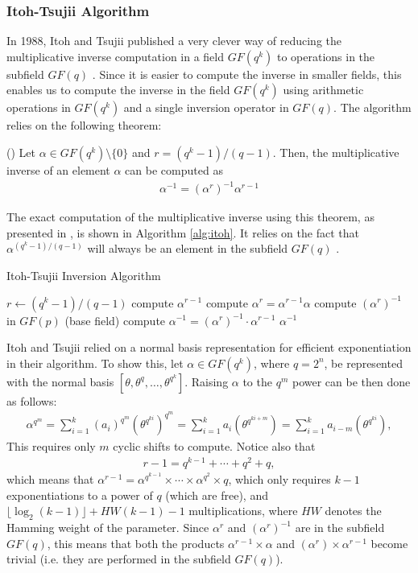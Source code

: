 \subsubsection{Itoh-Tsujii Algorithm}
In 1988, Itoh and Tsujii published a very clever way of reducing the multiplicative inverse computation in a field $GF(q^k)$ to operations in the subfield $GF(q)$ \cite{Itoh88-1}. Since it is easier to compute the inverse in smaller fields, this enables us to compute the inverse in the field $GF(q^k)$ using arithmetic operations in $GF(q^k)$ and a single inversion operator in $GF(q)$. The algorithm relies on the following theorem:
\begin{thm}
(\cite{Itoh88-1}) Let $\alpha \in GF(q^k) \setminus \{0\}$ and $r = (q^k - 1)/(q - 1)$. Then, the multiplicative inverse of an element $\alpha$ can be computed as
\begin{align*}
\alpha^{-1} = (\alpha^r)^{-1}\alpha^{r-1}
\end{align*}
\end{thm}
The exact computation of the multiplicative inverse using this theorem, as presented in \cite{Itoh88-1}, is shown in Algorithm \ref{alg:itoh}. It relies on the fact that $\alpha^{(q^k - 1)/(q-1)}$ will always be an element in the subfield $GF(q)$ \cite{Lidl94-1}.
\begin{algorithm}[t] %
\caption{Itoh-Tsujii Inversion Algorithm} \label{alg:itoh}
\begin{algorithmic}[1]
	\State $r \gets (q^k - 1)/(q-1)$
	\State compute $\alpha^{r-1}$
	\State compute $\alpha^r = \alpha^{r-1}\alpha$
	\State compute $(\alpha^r)^{-1}$ in $GF(p)$ (base field)
	\State compute $\alpha^{-1} = (\alpha^r)^{-1} \cdot \alpha^{r-1}$
	\State \Return $\alpha^{-1}$
\end{algorithmic}
\end{algorithm}
Itoh and Tsujii relied on a normal basis representation for efficient exponentiation in their algorithm. To show this, let $\alpha \in GF(q^k)$, where $q = 2^n$, be represented with the normal basis $[\theta,\theta^q,\dots,\theta^{q^{k}}]$. Raising $\alpha$ to the $q^m$ power can be then done as follows:
\begin{align*}
\alpha^{q^{m}} = \sum_{i = 1}^{k} (a_i)^{q^{m}} (\theta^{q^{ki}})^{q^{m}} = \sum_{i = 1}^{k}a_i(\theta^{q^{ki + m}}) = \sum_{i = 1}^{k}a_{i-m}(\theta^{q^{ki}}),
\end{align*}
This requires only $m$ cyclic shifts to compute. Notice also that 
\begin{align*}
r - 1 = q^{k - 1} + \dotsb + q^2 + q,
\end{align*}
which means that $\alpha^{r-1} = \alpha^{q^{k-1}} \times \dotsb \times \alpha^{q^{2}} \times q$, which only requires $k - 1$ exponentiations to a power of $q$ (which are free), and $\lfloor \log_2(k-1)\rfloor + HW(k - 1) - 1$ multiplications, where $HW$ denotes the Hamming weight of the parameter. Since $\alpha^r$ and $(\alpha^r)^{-1}$ are in the subfield $GF(q)$, this means that both the products $\alpha^{r-1} \times \alpha$ and $(\alpha^r)\times\alpha^{r-1}$ become trivial (i.e. they are performed in the subfield $GF(q)$). 


